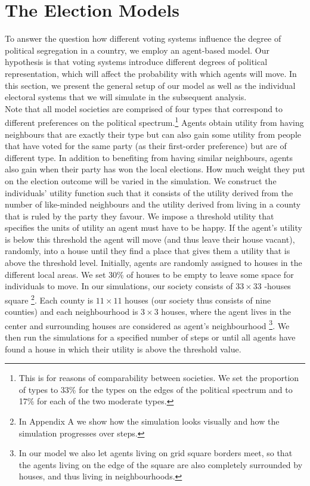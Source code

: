 \documentclass[12pt, a4paper]{article}
\begin{document}
	\section{\label{model}The Election Models}
	To answer the question how different voting systems influence the degree of political segregation in a country, we employ an agent-based model. Our hypothesis is that voting systems introduce different degrees of political representation, which will affect the probability with which agents will move. In this section, we present the general setup of our model as well as the individual electoral systems that we will simulate in the subsequent analysis.\\%
	Note that all model societies are comprised of four types that correspond to different preferences on the political spectrum.\footnote{This is for reasons of comparability between societies. We set the proportion of types to 33\% for the types on the edges of the political spectrum and to 17\% for each of the two moderate types.} Agents obtain utility from having neighbours that are exactly their type but can also gain some utility from people that have voted for the same party (as their first-order preference) but are of different type. In addition to benefiting from having similar neighbours, agents also gain when their party has won the local elections. How much weight they put on the election outcome will be varied in the simulation.
	We construct the individuals' utility function such that it consists of the utility derived from the number of like-minded neighbours and the utility derived from living in a county that is ruled by the party they favour.
	We impose a threshold utility that specifies the units of utility an agent must have to be happy. If the agent's utility is below this threshold the agent will move (and thus leave their house vacant), randomly, into a house until they find a place that gives them a utility that is above the threshold level. Initially, agents are randomly assigned to houses in the different local areas. We set 30\% of houses to be empty to leave some space for individuals to move.
	In our simulations, our society consists of $33\times33$ -houses square \footnote{In Appendix A we show how the simulation looks visually and how the simulation progresses over steps.}. Each county is $11\times11$ houses (our society thus consists of nine counties) and each neighbourhood is $3\times3$ houses, where the agent lives in the center and surrounding houses are considered as agent's neighbourhood \footnote{In our model we also let agents living on grid square borders meet, so that the agents living on the edge of the square are also completely surrounded by houses, and thus living in neighbourhoods.}.
	We then run the simulations for a specified number of steps or until all agents have found a house in which their utility is above the threshold value.
	
\end{document}
